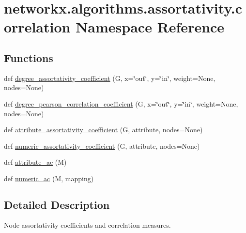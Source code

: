 \hypertarget{namespacenetworkx_1_1algorithms_1_1assortativity_1_1correlation}{}\section{networkx.\+algorithms.\+assortativity.\+correlation Namespace Reference}
\label{namespacenetworkx_1_1algorithms_1_1assortativity_1_1correlation}
\subsection*{Functions}
\begin{DoxyCompactItemize}
\item 
def \hyperlink{namespacenetworkx_1_1algorithms_1_1assortativity_1_1correlation_aa4d4adbe8aae494852d6561d6f3cb0dc}{degree\+\_\+assortativity\+\_\+coefficient} (G, x=\char`\"{}out\char`\"{}, y=\char`\"{}in\char`\"{}, weight=None, nodes=None)
\item 
def \hyperlink{namespacenetworkx_1_1algorithms_1_1assortativity_1_1correlation_abdb15d01a465144e1ad48b7d7ac218b3}{degree\+\_\+pearson\+\_\+correlation\+\_\+coefficient} (G, x=\char`\"{}out\char`\"{}, y=\char`\"{}in\char`\"{}, weight=None, nodes=None)
\item 
def \hyperlink{namespacenetworkx_1_1algorithms_1_1assortativity_1_1correlation_a0245893dbab54e1912798a3936d32439}{attribute\+\_\+assortativity\+\_\+coefficient} (G, attribute, nodes=None)
\item 
def \hyperlink{namespacenetworkx_1_1algorithms_1_1assortativity_1_1correlation_abbfe3c18569e6eff2686dd425a1f145a}{numeric\+\_\+assortativity\+\_\+coefficient} (G, attribute, nodes=None)
\item 
def \hyperlink{namespacenetworkx_1_1algorithms_1_1assortativity_1_1correlation_a42fde4374505f7a338a49e0bbc6cf55a}{attribute\+\_\+ac} (M)
\item 
def \hyperlink{namespacenetworkx_1_1algorithms_1_1assortativity_1_1correlation_af61efe96c03971b43acb9322acfcecb1}{numeric\+\_\+ac} (M, mapping)
\end{DoxyCompactItemize}


\subsection{Detailed Description}
\begin{DoxyVerb}Node assortativity coefficients and correlation measures.
\end{DoxyVerb}
 

